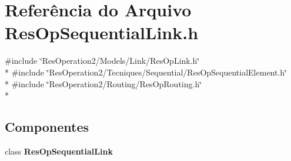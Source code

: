 \section{Referência do Arquivo Res\+Op\+Sequential\+Link.\+h}
\label{_res_op_sequential_link_8h}
{\ttfamily \#include \char`\"{}Res\+Operation2/\+Models/\+Link/\+Res\+Op\+Link.\+h\char`\"{}}\\*
{\ttfamily \#include \char`\"{}Res\+Operation2/\+Tecniques/\+Sequential/\+Res\+Op\+Sequential\+Element.\+h\char`\"{}}\\*
{\ttfamily \#include \char`\"{}Res\+Operation2/\+Routing/\+Res\+Op\+Routing.\+h\char`\"{}}\\*
\subsection*{Componentes}
\begin{DoxyCompactItemize}
\item 
class {\bf Res\+Op\+Sequential\+Link}
\end{DoxyCompactItemize}
